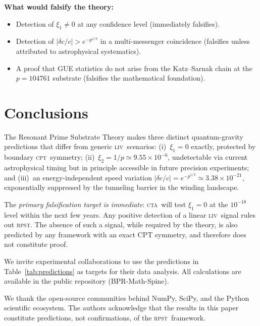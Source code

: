 \documentclass[aps,prd,twocolumn,showpacs,preprintnumbers]{revtex4-2}
\newcommand{\rpst}{\textsc{rpst}}
\newcommand{\CTA}{\textsc{cta}}
\newcommand{\LIV}{\textsc{liv}}
\newcommand{\CPT}{\textsc{cpt}}
\newcommand{\abs}[1]{\left|#1\right|}
\begin{document}
\textbf{What would falsify the theory:}
\begin{itemize}
  \item Detection of $\xi_1 \neq 0$ at any confidence level (immediately falsifies).
  \item Detection of $\abs{\delta c/c} > e^{-p^{1/3}}$ in a multi-messenger
    coincidence (falsifies unless attributed to astrophysical systematics).
  \item A proof that GUE statistics do not arise from the Katz--Sarnak chain
    at the $p = 104761$ substrate (falsifies the mathematical foundation).
\end{itemize}

\section{Conclusions}
\label{sec:conclusions}

The Resonant Prime Substrate Theory makes three distinct quantum-gravity
predictions that differ from generic \LIV\ scenarios:
(i)~$\xi_1 = 0$ exactly, protected by boundary \CPT\ symmetry;
(ii)~$\xi_2 = 1/p \simeq 9.55 \times 10^{-6}$, undetectable via current
astrophysical timing but in principle accessible in future precision experiments;
and (iii)~an energy-independent speed variation
$\abs{\delta c/c} = e^{-p^{1/3}} \simeq 3.38 \times 10^{-21}$, exponentially
suppressed by the tunneling barrier in the winding landscape.

The \textit{primary falsification target is immediate}: \CTA\ will
test $\xi_1 = 0$ at the $10^{-18}$ level within the next few years.  Any
positive detection of a linear \LIV\ signal rules out \rpst.  The absence of
such a signal, while required by the theory, is also predicted by any
framework with an exact CPT symmetry, and therefore does not constitute proof.

We invite experimental collaborations to use the predictions in
Table~\ref{tab:predictions} as targets for their data analysis.  All
calculations are available in the public repository (BPR-Math-Spine).

\begin{acknowledgments}
We thank the open-source communities behind NumPy, SciPy, and the Python
scientific ecosystem.  The authors acknowledge that the results in this paper
constitute predictions, not confirmations, of the \rpst\ framework.
\end{acknowledgments}
\end{document}
